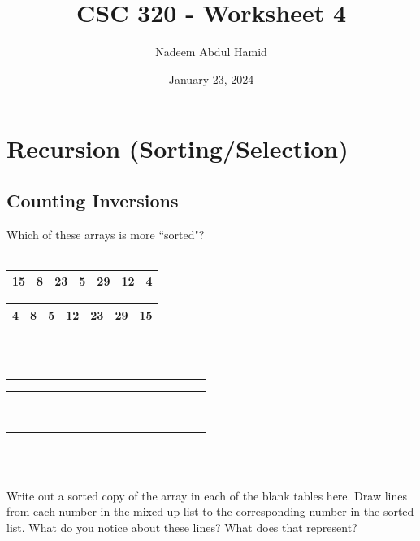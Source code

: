 \documentclass[12pt]{article}
\title{CSC 320 - Worksheet 4}
\author{Nadeem Abdul Hamid}
\date{January 23, 2024}
\begin{document}
\section{Recursion (Sorting/Selection)}

\subsection{Counting Inversions}

Which of these arrays is more ``sorted"?\\~

\begin{minipage}{0.5\textwidth}\centering
\begin{tabular}{|*{7}{c|}}
    \hline
    15 & 8 & 23 & 5 & 29 & 12 & 4 \\
    \hline
  \end{tabular}
\end{minipage}%
\begin{minipage}{0.5\textwidth}\centering
  \begin{tabular}{|*{7}{c|}}
    \hline
    4 & 8 & 5 & 12 & 23 & 29 & 15 \\
    \hline
  \end{tabular}
\end{minipage}%
  
\vspace{1in}

\begin{minipage}{0.5\textwidth}\centering
    \begin{tabular}{|*{7}{c|}}
        \hline
        ~~~  & ~~~  & ~~~ & ~~~ & ~~~ & ~~~ & ~~~ \\
        ~~~  & ~~~  & ~~~ & ~~~ & ~~~ & ~~~ & ~~~ \\
        \hline
      \end{tabular}
    \end{minipage}%
    \begin{minipage}{0.5\textwidth}\centering
      \begin{tabular}{|*{7}{c|}}
        \hline
        ~~~  & ~~~  & ~~~ & ~~~ & ~~~ & ~~~ & ~~~ \\
        ~~~  & ~~~  & ~~~ & ~~~ & ~~~ & ~~~ & ~~~ \\
        \hline
      \end{tabular}
    \end{minipage}%
\\~

Write out a sorted copy of the array in each of the blank tables here. Draw lines from each number in the mixed up list to the corresponding number in the sorted list. What do you notice about these lines? What does that represent?
\end{document}
